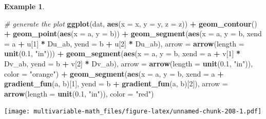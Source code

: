 \documentclass[
]{book}
\newenvironment{Shaded}{\begin{snugshade}}{\end{snugshade}}
\newcommand{\CommentTok}[1]{\textcolor[rgb]{0.56,0.35,0.01}{\textit{#1}}}
\newcommand{\DataTypeTok}[1]{\textcolor[rgb]{0.13,0.29,0.53}{#1}}
\newcommand{\DecValTok}[1]{\textcolor[rgb]{0.00,0.00,0.81}{#1}}
\newcommand{\FloatTok}[1]{\textcolor[rgb]{0.00,0.00,0.81}{#1}}
\newcommand{\KeywordTok}[1]{\textcolor[rgb]{0.13,0.29,0.53}{\textbf{#1}}}
\newcommand{\NormalTok}[1]{#1}
\newcommand{\OperatorTok}[1]{\textcolor[rgb]{0.81,0.36,0.00}{\textbf{#1}}}
\newcommand{\StringTok}[1]{\textcolor[rgb]{0.31,0.60,0.02}{#1}}
\theoremstyle{definition}
\theoremstyle{definition}
\newtheorem{example}{Example}[chapter]
\theoremstyle{definition}
\theoremstyle{definition}
\theoremstyle{remark}
\begin{document}
\begin{example}
\begin{Shaded}
\begin{Highlighting}[]
\CommentTok{# generate the plot}
\KeywordTok{ggplot}\NormalTok{(dat, }\KeywordTok{aes}\NormalTok{(}\DataTypeTok{x =}\NormalTok{ x, }\DataTypeTok{y =}\NormalTok{ y, }\DataTypeTok{z =}\NormalTok{ z)) }\OperatorTok{+}
\StringTok{        }\KeywordTok{geom_contour}\NormalTok{() }\OperatorTok{+}\StringTok{ }
\StringTok{        }\KeywordTok{geom_point}\NormalTok{(}\KeywordTok{aes}\NormalTok{(}\DataTypeTok{x =}\NormalTok{ a, }\DataTypeTok{y =}\NormalTok{ b)) }\OperatorTok{+}
\StringTok{        }\KeywordTok{geom_segment}\NormalTok{(}\KeywordTok{aes}\NormalTok{(}\DataTypeTok{x =}\NormalTok{ a, }\DataTypeTok{y =}\NormalTok{ b, }\DataTypeTok{xend =}\NormalTok{ a }\OperatorTok{+}\StringTok{ }\NormalTok{u[}\DecValTok{1}\NormalTok{] }\OperatorTok{*}\StringTok{ }\NormalTok{Du_ab, }\DataTypeTok{yend =}\NormalTok{ b }\OperatorTok{+}\StringTok{ }\NormalTok{u[}\DecValTok{2}\NormalTok{] }\OperatorTok{*}\StringTok{ }\NormalTok{Du_ab), }
                     \DataTypeTok{arrow =} \KeywordTok{arrow}\NormalTok{(}\DataTypeTok{length =} \KeywordTok{unit}\NormalTok{(}\FloatTok{0.1}\NormalTok{, }\StringTok{"in"}\NormalTok{))) }\OperatorTok{+}
\StringTok{        }\KeywordTok{geom_segment}\NormalTok{(}\KeywordTok{aes}\NormalTok{(}\DataTypeTok{x =}\NormalTok{ a, }\DataTypeTok{y =}\NormalTok{ b, }\DataTypeTok{xend =}\NormalTok{ a }\OperatorTok{+}\StringTok{ }\NormalTok{v[}\DecValTok{1}\NormalTok{] }\OperatorTok{*}\StringTok{ }\NormalTok{Dv_ab, }\DataTypeTok{yend =}\NormalTok{ b }\OperatorTok{+}\StringTok{ }\NormalTok{v[}\DecValTok{2}\NormalTok{] }\OperatorTok{*}\StringTok{ }\NormalTok{Dv_ab), }
                     \DataTypeTok{arrow =} \KeywordTok{arrow}\NormalTok{(}\DataTypeTok{length =} \KeywordTok{unit}\NormalTok{(}\FloatTok{0.1}\NormalTok{, }\StringTok{"in"}\NormalTok{)), }\DataTypeTok{color =} \StringTok{"orange"}\NormalTok{) }\OperatorTok{+}
\StringTok{        }\KeywordTok{geom_segment}\NormalTok{(}\KeywordTok{aes}\NormalTok{(}\DataTypeTok{x =}\NormalTok{ a, }\DataTypeTok{y =}\NormalTok{ b, }\DataTypeTok{xend =}\NormalTok{ a }\OperatorTok{+}\StringTok{ }\KeywordTok{gradient_fun}\NormalTok{(a, b)[}\DecValTok{1}\NormalTok{], }\DataTypeTok{yend =}\NormalTok{ b }\OperatorTok{+}\StringTok{ }\KeywordTok{gradient_fun}\NormalTok{(a, b)[}\DecValTok{2}\NormalTok{]), }
                     \DataTypeTok{arrow =} \KeywordTok{arrow}\NormalTok{(}\DataTypeTok{length =} \KeywordTok{unit}\NormalTok{(}\FloatTok{0.1}\NormalTok{, }\StringTok{"in"}\NormalTok{)), }\DataTypeTok{color =} \StringTok{"red"}\NormalTok{) }
\end{Highlighting}
\end{Shaded}

\texttt{[image: multivariable-math\_files/figure-latex/unnamed-chunk-208-1.pdf]}
\end{example}
\end{document}
